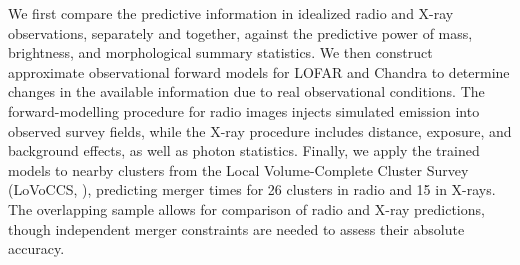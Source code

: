 We first compare the predictive information in idealized radio and X-ray observations, separately and together, against the predictive power of mass, brightness, and morphological summary statistics.
We then construct approximate observational forward models for LOFAR and Chandra to determine changes in the available information due to real observational conditions.
The forward-modelling procedure for radio images injects simulated emission into observed survey fields, while the X-ray procedure includes distance, exposure, and background effects, as well as photon statistics.
Finally, we apply the trained models to nearby clusters from the Local Volume-Complete Cluster Survey (LoVoCCS, \cite{Fu2022, Fu2024}), predicting merger times for 26 clusters in radio and 15 in X-rays.
The overlapping sample allows for comparison of radio and X-ray predictions, though independent merger constraints are needed to assess their absolute accuracy.